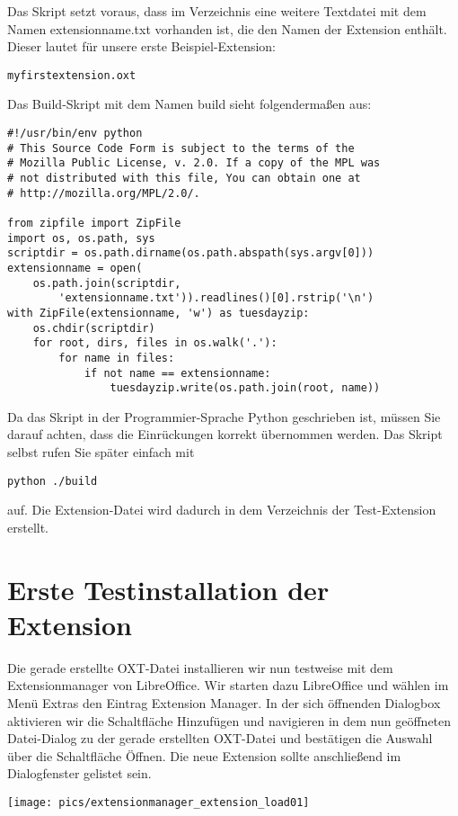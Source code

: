 \documentclass[a4paper,10pt,pagesize,titlepage]{scrbook}
\begin{document}
Das Skript setzt voraus, dass im Verzeichnis eine weitere Textdatei mit dem Namen extensionname.txt vorhanden ist, die den Namen der Extension enthält. Dieser lautet für unsere erste Beispiel-Extension:
\begin{lstlisting}
myfirstextension.oxt
\end{lstlisting}
Das Build-Skript mit dem Namen \glqq build\grqq{} sieht folgendermaßen aus:
\begin{lstlisting}
#!/usr/bin/env python
# This Source Code Form is subject to the terms of the 
# Mozilla Public License, v. 2.0. If a copy of the MPL was  
# not distributed with this file, You can obtain one at 
# http://mozilla.org/MPL/2.0/.

from zipfile import ZipFile
import os, os.path, sys
scriptdir = os.path.dirname(os.path.abspath(sys.argv[0]))
extensionname = open(
    os.path.join(scriptdir, 
        'extensionname.txt')).readlines()[0].rstrip('\n')
with ZipFile(extensionname, 'w') as tuesdayzip:
    os.chdir(scriptdir)
    for root, dirs, files in os.walk('.'):
        for name in files:
            if not name == extensionname:
                tuesdayzip.write(os.path.join(root, name)) 
\end{lstlisting}
Da das Skript in der Programmier-Sprache Python geschrieben ist, müssen Sie darauf achten, dass die Einrückungen korrekt übernommen werden. Das Skript selbst rufen Sie später einfach mit
\begin{lstlisting}
python ./build
\end{lstlisting}
auf. Die Extension-Datei wird dadurch in dem Verzeichnis der Test-Extension erstellt.

\section{Erste Testinstallation der Extension}

Die gerade erstellte OXT-Datei installieren wir nun testweise mit dem Extensionmanager von LibreOffice. Wir starten dazu LibreOffice und wählen im Menü Extras den Eintrag \glqq Extension Manager\grqq. In der sich öffnenden Dialogbox aktivieren wir die Schaltfläche \glqq Hinzufügen\grqq{} und navigieren in dem nun geöffneten Datei-Dialog zu der gerade erstellten OXT-Datei und bestätigen die Auswahl über die Schaltfläche \glqq Öffnen\grqq. Die neue Extension sollte anschließend im Dialogfenster gelistet sein.
\begin{center}
	\captionsetup{type=figure}
\texttt{[image: pics/extensionmanager\_extension\_load01]}
\label{fig:extensionmanager_extension_load01}
\end{center}
\end{document}
